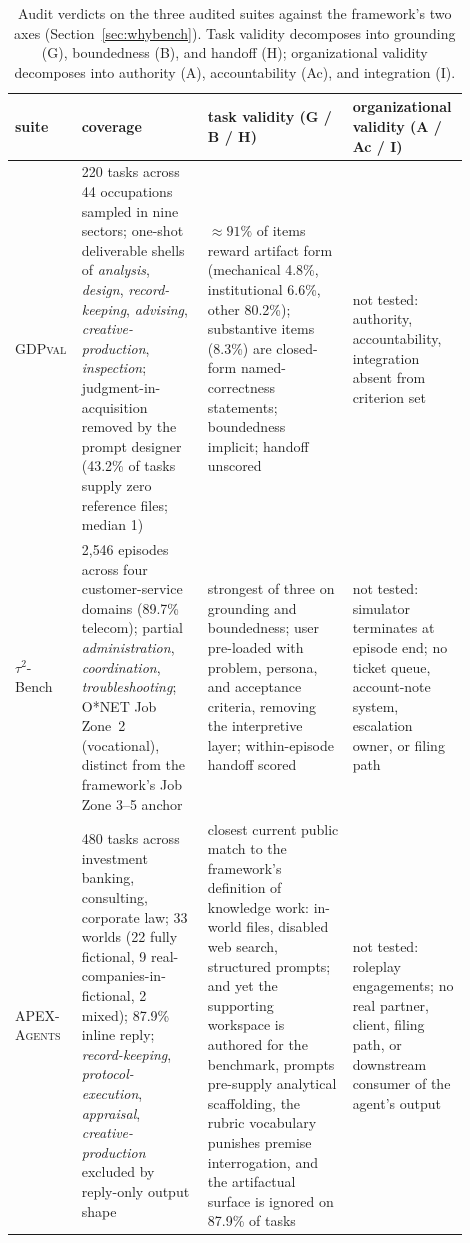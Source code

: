 \documentclass{article}
\begin{document}
\begin{table}[!htbp]
\caption{Audit verdicts on the three audited suites against the framework's two axes (Section~\ref{sec:whybench}). Task validity decomposes into grounding (G), boundedness (B), and handoff (H); organizational validity decomposes into authority (A), accountability (Ac), and integration (I).}
\label{tab:audit-three}
\centering
\scriptsize
\setlength{\tabcolsep}{4pt}
\renewcommand{\arraystretch}{1.15}
\begin{tabular}{p{0.10\linewidth} p{0.27\linewidth} p{0.31\linewidth} p{0.22\linewidth}}
\toprule
suite & coverage & task validity (G / B / H) & organizational validity (A / Ac / I) \\
\midrule
\textsc{GDPval} & 220 tasks across 44 occupations sampled in nine sectors; one-shot deliverable shells of \emph{analysis}, \emph{design}, \emph{record-keeping}, \emph{advising}, \emph{creative-production}, \emph{inspection}; judgment-in-acquisition removed by the prompt designer (43.2\% of tasks supply zero reference files; median 1) & ${\approx}91\%$ of items reward artifact form (mechanical 4.8\%, institutional 6.6\%, other 80.2\%); substantive items (8.3\%) are closed-form named-correctness statements; boundedness implicit; handoff unscored & not tested: authority, accountability, integration absent from criterion set \\
\addlinespace[2pt]
$\tau^2$-Bench & 2{,}546 episodes across four customer-service domains (89.7\% telecom); partial \emph{administration}, \emph{coordination}, \emph{troubleshooting}; O{*}NET Job Zone~2 (vocational), distinct from the framework's Job Zone 3--5 anchor & strongest of three on grounding and boundedness; user pre-loaded with problem, persona, and acceptance criteria, removing the interpretive layer; within-episode handoff scored & not tested: simulator terminates at episode end; no ticket queue, account-note system, escalation owner, or filing path \\
\addlinespace[2pt]
\textsc{APEX-Agents} & 480 tasks across investment banking, consulting, corporate law; 33 worlds (22 fully fictional, 9 real-companies-in-fictional, 2 mixed); 87.9\% inline reply; \emph{record-keeping}, \emph{protocol-execution}, \emph{appraisal}, \emph{creative-production} excluded by reply-only output shape & closest current public match to the framework's definition of knowledge work: in-world files, disabled web search, structured prompts; and yet the supporting workspace is authored for the benchmark, prompts pre-supply analytical scaffolding, the rubric vocabulary punishes premise interrogation, and the artifactual surface is ignored on 87.9\% of tasks & not tested: roleplay engagements; no real partner, client, filing path, or downstream consumer of the agent's output \\
\bottomrule
\end{tabular}
\end{table}
\end{document}
